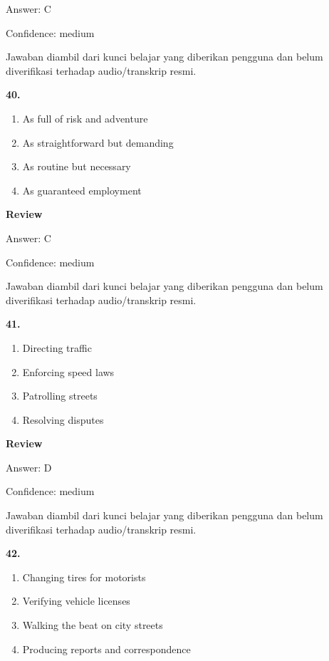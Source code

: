 \documentclass[12pt]{article}
\begin{document}
Answer: C\par
Confidence: medium\par
Jawaban diambil dari kunci belajar yang diberikan pengguna dan belum diverifikasi terhadap audio/transkrip resmi.\par
\endgroup
\par
\vspace{0.25\baselineskip}
\noindent\textbf{40.}
\begin{enumerate}[label=(\Alph*),leftmargin=*,itemsep=0.2em]
\item As full of risk and adventure
\item As straightforward but demanding
\item As routine but necessary
\item As guaranteed employment
\end{enumerate}
\par
\begingroup
\setlength{\parskip}{0pt}
\setlength{\parindent}{0pt}
\textbf{Review}\par
Answer: C\par
Confidence: medium\par
Jawaban diambil dari kunci belajar yang diberikan pengguna dan belum diverifikasi terhadap audio/transkrip resmi.\par
\endgroup
\par
\vspace{0.25\baselineskip}
\noindent\textbf{41.}
\begin{enumerate}[label=(\Alph*),leftmargin=*,itemsep=0.2em]
\item Directing traffic
\item Enforcing speed laws
\item Patrolling streets
\item Resolving disputes
\end{enumerate}
\par
\begingroup
\setlength{\parskip}{0pt}
\setlength{\parindent}{0pt}
\textbf{Review}\par
Answer: D\par
Confidence: medium\par
Jawaban diambil dari kunci belajar yang diberikan pengguna dan belum diverifikasi terhadap audio/transkrip resmi.\par
\endgroup
\par
\vspace{0.25\baselineskip}
\noindent\textbf{42.}
\begin{enumerate}[label=(\Alph*),leftmargin=*,itemsep=0.2em]
\item Changing tires for motorists
\item Verifying vehicle licenses
\item Walking the beat on city streets
\item Producing reports and correspondence
\end{enumerate}
\end{document}
